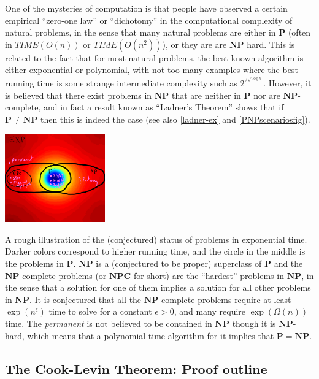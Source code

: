 One of the mysteries of computation is that people have observed a
certain empirical ``zero-one law'' or ``dichotomy'' in the computational
complexity of natural problems, in the sense that many natural problems
are either in \(\mathbf{P}\) (often in
\(\ensuremath{\mathit{TIME}}(O(n))\) or
\(\ensuremath{\mathit{TIME}}(O(n^2))\)), or they are are \(\mathbf{NP}\)
hard. This is related to the fact that for most natural problems, the
best known algorithm is either exponential or polynomial, with not too
many examples where the best running time is some strange intermediate
complexity such as \(2^{2^{\sqrt{\log n}}}\). However, it is believed
that there exist problems in \(\mathbf{NP}\) that are neither in
\(\mathbf{P}\) nor are \(\mathbf{NP}\)-complete, and in fact a result
known as ``Ladner's Theorem'' shows that if
\(\mathbf{P} \neq \mathbf{NP}\) then this is indeed the case (see also
\cref{ladner-ex} and \cref{PNPscenariosfig}).


\begin{marginfigure}
\centering
\includegraphics[width=\linewidth, height=1.5in, keepaspectratio]{../figure/PNPmap.png}
\caption{A rough illustration of the (conjectured) status of problems in
exponential time. Darker colors correspond to higher running time, and
the circle in the middle is the problems in \(\mathbf{P}\).
\(\mathbf{NP}\) is a (conjectured to be proper) superclass of
\(\mathbf{P}\) and the \(\mathbf{NP}\)-complete problems (or
\(\mathbf{NPC}\) for short) are the ``hardest'' problems in
\(\mathbf{NP}\), in the sense that a solution for one of them implies a
solution for all other problems in \(\mathbf{NP}\). It is conjectured
that all the \(\mathbf{NP}\)-complete problems require at least
\(\exp(n^\epsilon)\) time to solve for a constant \(\epsilon>0\), and
many require \(\exp(\Omega(n))\) time. The \emph{permanent} is not
believed to be contained in \(\mathbf{NP}\) though it is
\(\mathbf{NP}\)-hard, which means that a polynomial-time algorithm for
it implies that \(\mathbf{P}=\mathbf{NP}\).}
\label{complexitymapfig}
\end{marginfigure}

\subsection{The Cook-Levin Theorem: Proof
outline}\label{The-Cook-Levin-Theorem-Pr}


